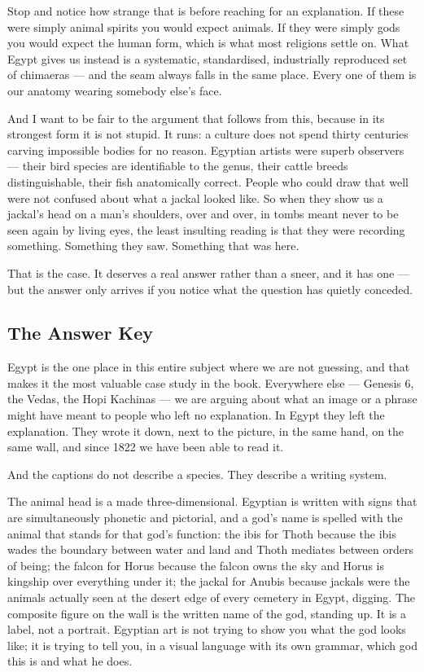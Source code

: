 Stop and notice how strange that is before reaching for an explanation. If these were simply
animal spirits you would expect animals. If they were simply gods you would expect the human
form, which is what most religions settle on. What Egypt gives us instead is a systematic,
standardised, industrially reproduced set of chimaeras --- and the seam always falls in the same
place. Every one of them is our anatomy wearing somebody else's face.

And I want to be fair to the argument that follows from this, because in its strongest form it is
not stupid. It runs: a culture does not spend thirty centuries carving impossible bodies for no
reason. Egyptian artists were superb observers --- their bird species are identifiable to the
genus, their cattle breeds distinguishable, their fish anatomically correct. People who could
draw that well were not confused about what a jackal looked like. So when they show us a jackal's
head on a man's shoulders, over and over, in tombs meant never to be seen again by living eyes,
the least insulting reading is that they were recording something. Something they saw. Something
that was here.

That is the case. It deserves a real answer rather than a sneer, and it has one --- but the
answer only arrives if you notice what the question has quietly conceded.

\subsection{The Answer Key}\label{sec:answerkey}

Egypt is the one place in this entire subject where we are not guessing, and that makes it the
most valuable case study in the book. Everywhere else --- Genesis 6, the Vedas, the Hopi
Kachinas --- we are arguing about what an image or a phrase might have meant to people who left
no explanation. In Egypt they left the explanation. They wrote it down, next to the picture, in
the same hand, on the same wall, and since 1822 we have been able to read it.

And the captions do not describe a species. They describe a writing system.

The animal head is a  made three-dimensional. Egyptian is written with signs
that are simultaneously phonetic and pictorial, and a god's name is spelled with the animal that
stands for that god's function: the ibis for Thoth because the ibis wades the boundary between
water and land and Thoth mediates between orders of being; the falcon for Horus because the
falcon owns the sky and Horus is kingship over everything under it; the jackal for Anubis because
jackals were the animals actually seen at the desert edge of every cemetery in Egypt, digging.
The composite figure on the wall is the written name of the god, standing up. It is a label, not
a portrait. Egyptian art is not trying to show you what the god looks like; it is trying to tell
you, in a visual language with its own grammar, which god this is and what he does.

